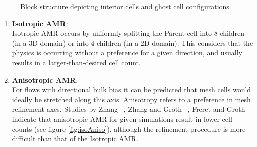 %  
\begin{figure}[t!]
  \centering
\caption{Block structure depicting interior cells and ghost cell configurations} 
\label{fig:unifNon}    
\end{figure}  
  

\begin{enumerate}

\item \textbf{Isotropic AMR}:\\
Isotropic AMR  occurs by uniformly splitting the Parent cell into 8 children (in a 3D domain) or into 4 children (in a 2D domain). This considers that the physics is occurring without a preference for a given direction, and usually results in a larger-than-desired cell count.


\item \textbf{Anisotropic AMR}: \\
For flows with directional bulk bias it can be predicted that mesh cells would ideally be stretched along this axis. Anisotropy refers to a preference in mesh refinement axes. Studies by Zhang ~\cite{zhang:2011a}, Zhang and Groth ~\cite{zhang:2011b}, Freret and Groth ~\cite{Freret:2015} indicate that anisotropic AMR for given simulations result in lower cell counts (see figure \ref{fig:isoAniso}), although the refinement procedure is more difficult than that of the Isotropic AMR. \par

\end{enumerate}

